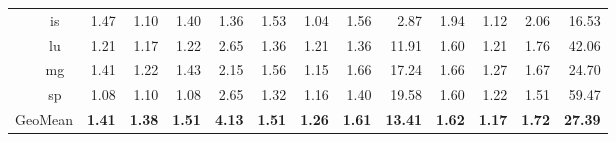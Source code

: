 \begin{tabular}{|c|c|rrrr|rrrr|rrrr|}
 & is & 1.47 & 1.10 & 1.40 & 1.36 & 1.53 & 1.04 & 1.56 & 2.87 & 1.94 & 1.12 & 2.06 & 16.53 \\
 & lu & 1.21 & 1.17 & 1.22 & 2.65 & 1.36 & 1.21 & 1.36 & 11.91 & 1.60 & 1.21 & 1.76 & 42.06 \\
 & mg & 1.41 & 1.22 & 1.43 & 2.15 & 1.56 & 1.15 & 1.66 & 17.24 & 1.66 & 1.27 & 1.67 & 24.70 \\
 & sp & 1.08 & 1.10 & 1.08 & 2.65 & 1.32 & 1.16 & 1.40 & 19.58 & 1.60 & 1.22 & 1.51 & 59.47 \\ \hline
\multicolumn{2}{|c|}{GeoMean} & \textbf{1.41} & \textbf{1.38} & \textbf{1.51} & \textbf{4.13} & \textbf{1.51} & \textbf{1.26} & \textbf{1.61} & \textbf{13.41} & \textbf{1.62} & \textbf{1.17} & \textbf{1.72} & \textbf{27.39} \\ \hline
\end{tabular}